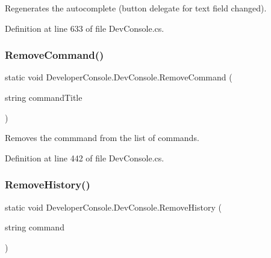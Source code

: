 Regenerates the autocomplete (button delegate for text field changed). 



Definition at line 633 of file Dev\+Console.\+cs.

\mbox{\label{class_developer_console_1_1_dev_console_aa8f421feb7ebe03f0575a1ccf5cbe13a}} 
\subsubsection{\texorpdfstring{Remove\+Command()}{RemoveCommand()}}
{\footnotesize\ttfamily static void Developer\+Console.\+Dev\+Console.\+Remove\+Command (\begin{DoxyParamCaption}\item[{string}]{command\+Title }\end{DoxyParamCaption})\hspace{0.3cm}{\ttfamily [static]}}



Removes the commmand from the list of commands. 



Definition at line 442 of file Dev\+Console.\+cs.

\mbox{\label{class_developer_console_1_1_dev_console_a55e287794c05ce2ff7e65153f71f7a1a}} 
\subsubsection{\texorpdfstring{Remove\+History()}{RemoveHistory()}}
{\footnotesize\ttfamily static void Developer\+Console.\+Dev\+Console.\+Remove\+History (\begin{DoxyParamCaption}\item[{string}]{command }\end{DoxyParamCaption})\hspace{0.3cm}{\ttfamily [static]}}



